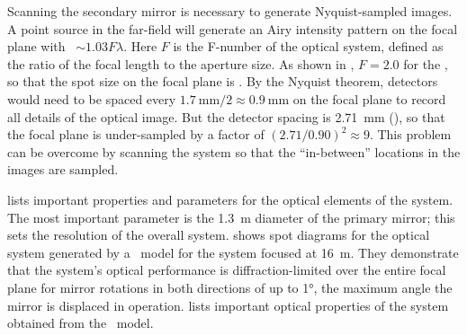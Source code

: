 Scanning the secondary mirror is necessary to generate Nyquist-sampled images.
A point source in the far-field will generate an Airy intensity pattern on the focal plane with \FWHM\ $\sim 1.03 F \lambda$.
Here $F$ is the F-number of the optical system, defined as the ratio of the focal length to the aperture size.
As shown in , $F = 2.0$ for the \Imager, so that the spot size on the focal plane is .
By the Nyquist theorem, detectors would need to be spaced every $ \SI{1.7}{\mm} / 2 \approx \SI{0.9}{\mm}$ on the focal plane to record all details of the optical image.
But the detector spacing is \SI{2.71}{\mm} (), so that the focal plane is under-sampled by a factor of $ (2.71/0.90)^2 \approx 9$.
This problem can be overcome by scanning the system so that the ``in-between'' locations in the images are sampled. 

 lists important properties and parameters for the optical elements of the system.
The most important parameter is the \SI{1.3}{\m} diameter of the primary mirror; this sets the resolution of the overall system.
 shows spot diagrams for the optical system generated by a \ZEMAX\ model for the system focused at \SI{16}{\m}.
They demonstrate that the system's optical performance is diffraction-limited over the entire focal plane for mirror rotations in both directions of up to \ang{1}, the maximum angle the mirror is displaced in operation.
 lists important optical properties of the system obtained from the \ZEMAX\ model.

